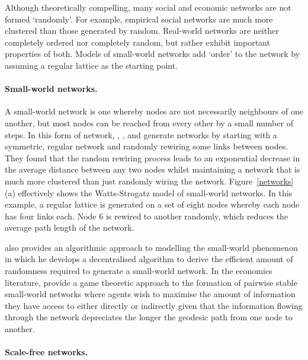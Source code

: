 Although theoretically compelling, many social and economic networks are not formed `randomly'. For example, empirical social networks are much more clustered than those generated by random. Real-world networks are neither completely ordered nor completely random, but rather exhibit important properties of both. Models of small-world networks add `order' to the network by assuming a regular lattice as the starting point.

\paragraph{Small-world networks.}

A small-world network is one whereby nodes are not necessarily neighbours of one another, but most nodes can be reached from every other by a small number of steps. In this form of network, \citet{WattsStrogatz1998}, \citet{Watts1999}, and \citet{NewmanStrogatzWatts2001} generate networks by starting with a symmetric, regular network and randomly rewiring some links between nodes. They found that the random rewiring process leads to an exponential decrease in the average distance between any two nodes whilst maintaining a network that is much more clustered than just randomly wiring the network. Figure~\ref{networks} (a) effectively shows the Watts-Strogatz model of small-world networks. In this example, a regular lattice is generated on a set of eight nodes whereby each node has four links each. Node 6 is rewired to another randomly, which reduces the average path length of the network.

\citet{Kleinberg2000a, Kleinberg2000b} also provides an algorithmic approach to modelling the small-world phenomenon in which he develops a decentralised algorithm to derive the efficient amount of randomness required to generate a small-world network. In the economics literature, \citet{JacksonRogers2005} provide a game theoretic approach to the formation of pairwise stable small-world networks where agents wish to maximise the amount of information they have access to either directly or indirectly given that the information flowing through the network depreciates the longer the geodesic path from one node to another.

\paragraph{Scale-free networks.}

